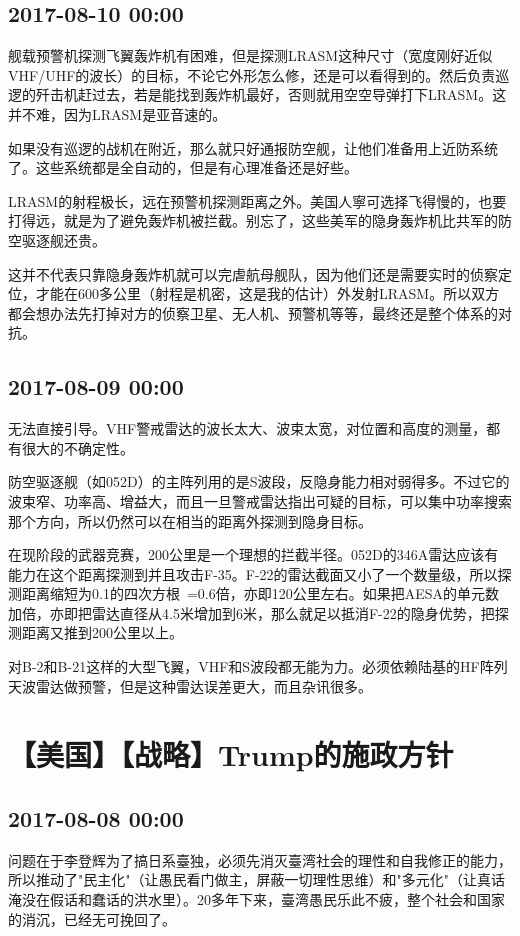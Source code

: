 \documentclass[twocolumn]{ctexart}
\begin{document}
\subsection*{2017-08-10 00:00}
舰载预警机探测飞翼轰炸机有困难，但是探测LRASM这种尺寸（宽度刚好近似VHF/UHF的波长）的目标，不论它外形怎么修，还是可以看得到的。然后负责巡逻的歼击机赶过去，若是能找到轰炸机最好，否则就用空空导弹打下LRASM。这并不难，因为LRASM是亚音速的。

如果没有巡逻的战机在附近，那么就只好通报防空舰，让他们准备用上近防系统了。这些系统都是全自动的，但是有心理准备还是好些。

LRASM的射程极长，远在预警机探测距离之外。美国人寧可选择飞得慢的，也要打得远，就是为了避免轰炸机被拦截。别忘了，这些美军的隐身轰炸机比共军的防空驱逐舰还贵。

这并不代表只靠隐身轰炸机就可以完虐航母舰队，因为他们还是需要实时的侦察定位，才能在600多公里（射程是机密，这是我的估计）外发射LRASM。所以双方都会想办法先打掉对方的侦察卫星、无人机、预警机等等，最终还是整个体系的对抗。\subsection*{2017-08-09 00:00}
无法直接引导。VHF警戒雷达的波长太大、波束太宽，对位置和高度的测量，都有很大的不确定性。

防空驱逐舰（如052D）的主阵列用的是S波段，反隐身能力相对弱得多。不过它的波束窄、功率高、增益大，而且一旦警戒雷达指出可疑的目标，可以集中功率搜索那个方向，所以仍然可以在相当的距离外探测到隐身目标。

在现阶段的武器竞赛，200公里是一个理想的拦截半径。052D的346A雷达应该有能力在这个距离探测到并且攻击F-35。F-22的雷达截面又小了一个数量级，所以探测距离缩短为0.1的四次方根~=0.6倍，亦即120公里左右。如果把AESA的单元数加倍，亦即把雷达直径从4.5米增加到6米，那么就足以抵消F-22的隐身优势，把探测距离又推到200公里以上。

对B-2和B-21这样的大型飞翼，VHF和S波段都无能为力。必须依赖陆基的HF阵列天波雷达做预警，但是这种雷达误差更大，而且杂讯很多。\section*{【美国】【战略】Trump的施政方针}
\subsection*{2017-08-08 00:00}
问题在于李登辉为了搞日系臺独，必须先消灭臺湾社会的理性和自我修正的能力，所以推动了"民主化"（让愚民看门做主，屏蔽一切理性思维）和"多元化"（让真话淹没在假话和蠢话的洪水里）。20多年下来，臺湾愚民乐此不疲，整个社会和国家的消沉，已经无可挽回了。
\end{document}
